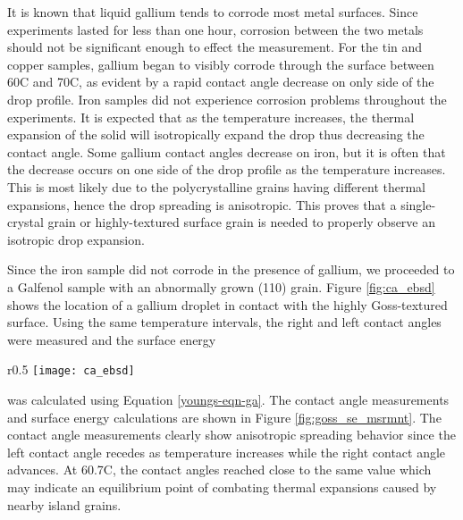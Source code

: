 It is known that liquid gallium tends to corrode most metal surfaces.\cite{Lewandowski2015,Narh1998,Fitzgerald1999} Since experiments lasted for less than one hour, corrosion between the two metals should not be significant enough to effect the measurement. For the tin and copper samples, gallium began to visibly corrode through the surface between 60\degree C and 70\degree C, as evident by a rapid contact angle decrease on only side of the drop profile. Iron samples did not experience corrosion problems throughout the experiments. It is expected that as the temperature increases, the thermal expansion of the solid will isotropically expand the drop thus decreasing the contact angle. Some gallium contact angles decrease on iron, but it is often that the decrease occurs on one side of the drop profile as the temperature increases. This is most likely due to the polycrystalline grains having different thermal expansions, hence the drop spreading is anisotropic. This proves that a single-crystal grain or highly-textured surface grain is needed to properly observe an isotropic drop expansion. 


Since the iron sample did not corrode in the presence of gallium, we proceeded to a Galfenol sample with an abnormally grown \hkl(110) grain. Figure \ref{fig:ca_ebsd} shows the location of a gallium droplet in contact with the highly Goss-textured surface. Using the same temperature intervals, the right and left contact angles were measured and the surface energy
\begin{wrapfigure}[8]{r}{0.5\linewidth}
	\centering
	\texttt{[image: ca\_ebsd]}
	\caption{The location of a gallium drop on highly Goss-textured surface.}
	\label{fig:ca_ebsd}
\end{wrapfigure}
 was calculated using Equation \ref{youngs-eqn-ga}. The contact angle measurements and surface energy calculations are shown in Figure \ref{fig:goss_se_msrmnt}. The contact angle measurements clearly show anisotropic spreading behavior since the left contact angle recedes as temperature increases while the right contact angle advances. At 60.7\degree C, the contact angles reached close to the same value which may indicate an equilibrium point of combating thermal expansions caused by nearby island grains. 

